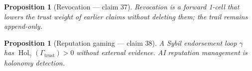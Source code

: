 \documentclass[11pt,a4paper]{article}
\newtheorem{proposition}[definition]{Proposition}
\begin{document}
\begin{proposition}[Revocation --- claim 37]
Revocation is a forward 1-cell that lowers the trust weight of earlier
claims without deleting them; the trail remains append-only.
\end{proposition}

\begin{proposition}[Reputation gaming --- claim 38]
A Sybil endorsement loop $\gamma$ has $\operatorname{Hol}_\gamma(\Gamma_{\mathrm{trust}})>0$
without external evidence. AI reputation management is holonomy detection.
\end{proposition}
\end{document}
